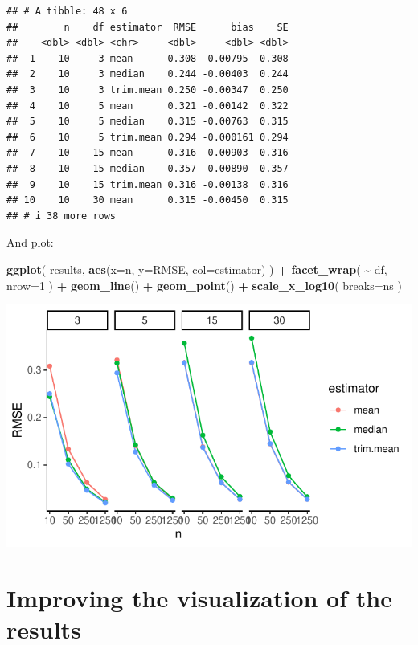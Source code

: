 \documentclass[
]{book}
\newenvironment{Shaded}{\begin{snugshade}}{\end{snugshade}}
\newcommand{\AttributeTok}[1]{\textcolor[rgb]{0.13,0.29,0.53}{#1}}
\newcommand{\DecValTok}[1]{\textcolor[rgb]{0.00,0.00,0.81}{#1}}
\newcommand{\FunctionTok}[1]{\textcolor[rgb]{0.13,0.29,0.53}{\textbf{#1}}}
\newcommand{\NormalTok}[1]{#1}
\newcommand{\SpecialCharTok}[1]{\textcolor[rgb]{0.81,0.36,0.00}{\textbf{#1}}}
\begin{document}
\begin{verbatim}
## # A tibble: 48 x 6
##        n    df estimator  RMSE      bias    SE
##    <dbl> <dbl> <chr>     <dbl>     <dbl> <dbl>
##  1    10     3 mean      0.308 -0.00795  0.308
##  2    10     3 median    0.244 -0.00403  0.244
##  3    10     3 trim.mean 0.250 -0.00347  0.250
##  4    10     5 mean      0.321 -0.00142  0.322
##  5    10     5 median    0.315 -0.00763  0.315
##  6    10     5 trim.mean 0.294 -0.000161 0.294
##  7    10    15 mean      0.316 -0.00903  0.316
##  8    10    15 median    0.357  0.00890  0.357
##  9    10    15 trim.mean 0.316 -0.00138  0.316
## 10    10    30 mean      0.315 -0.00450  0.315
## # i 38 more rows
\end{verbatim}

And plot:

\begin{Shaded}
\begin{Highlighting}[]
\FunctionTok{ggplot}\NormalTok{( results, }\FunctionTok{aes}\NormalTok{(}\AttributeTok{x=}\NormalTok{n, }\AttributeTok{y=}\NormalTok{RMSE, }\AttributeTok{col=}\NormalTok{estimator) ) }\SpecialCharTok{+}
            \FunctionTok{facet\_wrap}\NormalTok{( }\SpecialCharTok{\textasciitilde{}}\NormalTok{ df, }\AttributeTok{nrow=}\DecValTok{1}\NormalTok{ ) }\SpecialCharTok{+}
            \FunctionTok{geom\_line}\NormalTok{() }\SpecialCharTok{+} \FunctionTok{geom\_point}\NormalTok{() }\SpecialCharTok{+}
            \FunctionTok{scale\_x\_log10}\NormalTok{( }\AttributeTok{breaks=}\NormalTok{ns )}
\end{Highlighting}
\end{Shaded}

\begin{center}\includegraphics[width=0.75\linewidth]{Designing-Simulations-in-R_files/figure-latex/unnamed-chunk-182-1} \end{center}

\section{Improving the visualization of the results}\label{improving-the-visualization-of-the-results}
\end{document}
